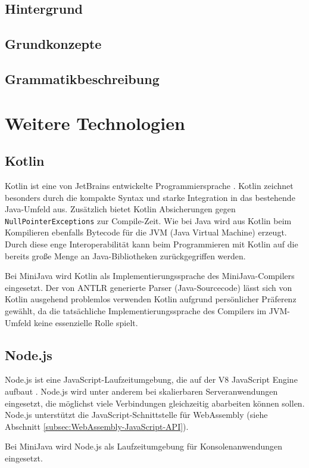 \subsection{Hintergrund}
\subsection{Grundkonzepte}
\subsection{Grammatikbeschreibung}

\section{Weitere Technologien}
\subsection{Kotlin}
Kotlin ist eine von JetBrains entwickelte Programmiersprache \cite{KotlinReference}. Kotlin zeichnet besonders durch die kompakte Syntax und starke Integration in das bestehende Java-Umfeld aus. Zusätzlich bietet Kotlin Absicherungen gegen \lstinline{NullPointerExceptions} zur Compile-Zeit. Wie bei Java wird aus Kotlin beim Kompilieren ebenfalls Bytecode für die JVM (Java Virtual Machine) erzeugt. Durch diese enge Interoperabilität kann beim Programmieren mit Kotlin auf die bereits große Menge an Java-Bibliotheken zurückgegriffen werden.

Bei MiniJava wird Kotlin als Implementierungssprache des MiniJava-Compilers eingesetzt. Der von ANTLR generierte Parser (Java-Sourcecode) lässt sich von Kotlin ausgehend problemlos verwenden Kotlin aufgrund persönlicher Präferenz gewählt, da die tatsächliche Implementierungssprache des Compilers im JVM-Umfeld keine essenzielle Rolle spielt.

\subsection{Node.js}
Node.js ist eine JavaScript-Laufzeitumgebung, die auf der V8 JavaScript Engine aufbaut \cite{NodeJSDocumentation}. Node.js wird unter anderem bei skalierbaren Serveranwendungen eingesetzt, die möglichst viele Verbindungen gleichzeitig abarbeiten können sollen. Node.js unterstützt die JavaScript-Schnittstelle für WebAssembly (siehe Abschnitt \ref{subsec:WebAssembly-JavaScript-API}).

Bei MiniJava wird Node.js als Laufzeitumgebung für Konsolenanwendungen eingesetzt.

